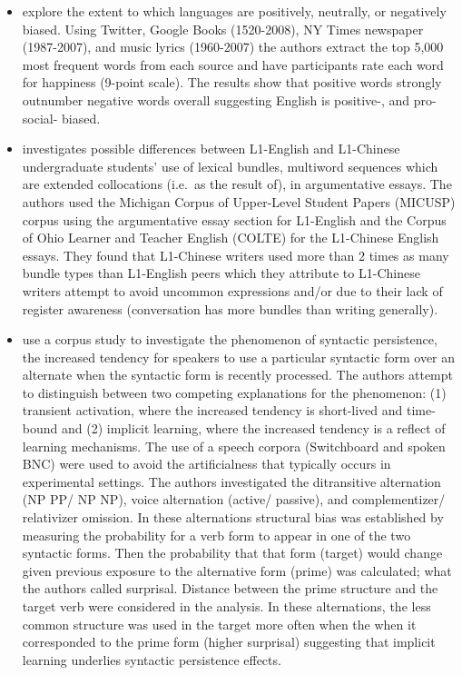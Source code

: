 \documentclass[
]{article}
\newenvironment{rmdblock}[1]
  {\begin{shaded*}
  \begin{itemize}
  \renewcommand{\labelitemi}{
    \raisebox{-.5\height}[0pt][0pt]{
      {\setkeys{Gin}{width=2em,keepaspectratio}\texttt{[image: assets/images/\#1]}}
    }
  }
  \item
  }
  {
  \end{itemize}
  \end{shaded*}
  }
\newenvironment{rmdtodo}
  {\begin{rmdblock}{paper}}
  {\end{rmdblock}}
\begin{document}
\begin{rmdtodo}
\citet{Kloumann2012} explore the extent to which languages are positively, neutrally, or negatively biased. Using Twitter, Google Books (1520-2008), NY Times newspaper (1987-2007), and music lyrics (1960-2007) the authors extract the top 5,000 most frequent words from each source and have participants rate each word for happiness (9-point scale). The results show that positive words strongly outnumber negative words overall suggesting English is positive-, and pro-social- biased.
\end{rmdtodo}

\begin{rmdtodo}
\citet{Bychkovska2017} investigates possible differences between L1-English and L1-Chinese undergraduate students' use of lexical bundles, multiword sequences which are extended collocations (i.e.~as the result of), in argumentative essays. The authors used the Michigan Corpus of Upper-Level Student Papers (MICUSP) corpus using the argumentative essay section for L1-English and the Corpus of Ohio Learner and Teacher English (COLTE) for the L1-Chinese English essays. They found that L1-Chinese writers used more than 2 times as many bundle types than L1-English peers which they attribute to L1-Chinese writers attempt to avoid uncommon expressions and/or due to their lack of register awareness (conversation has more bundles than writing generally).
\end{rmdtodo}

\begin{rmdtodo}
\citet{Jaeger:2007a} use a corpus study to investigate the phenomenon of syntactic persistence, the increased tendency for speakers to use a particular syntactic form over an alternate when the syntactic form is recently processed. The authors attempt to distinguish between two competing explanations for the phenomenon: (1) transient activation, where the increased tendency is short-lived and time-bound and (2) implicit learning, where the increased tendency is a reflect of learning mechanisms. The use of a speech corpora (Switchboard and spoken BNC) were used to avoid the artificialness that typically occurs in experimental settings. The authors investigated the ditransitive alternation (NP PP/ NP NP), voice alternation (active/ passive), and complementizer/ relativizer omission. In these alternations structural bias was established by measuring the probability for a verb form to appear in one of the two syntactic forms. Then the probability that that form (target) would change given previous exposure to the alternative form (prime) was calculated; what the authors called surprisal. Distance between the prime structure and the target verb were considered in the analysis. In these alternations, the less common structure was used in the target more often when the when it corresponded to the prime form (higher surprisal) suggesting that implicit learning underlies syntactic persistence effects.
\end{rmdtodo}
\end{document}
